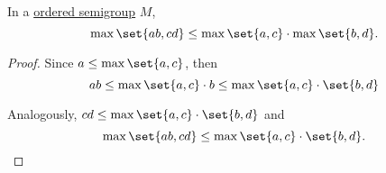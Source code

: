 \begin{lemma}\label{thm:ordered_semigroup_max_distributivity}
  In a \hyperref[def:ordered_semigroup]{ordered semigroup} \( M \),
  \begin{equation}\label{eq:thm:ordered_semigroup_max_distributivity}
    \max \set{a b, c d} \leq \max \set{a, c} \cdot \max \set{b, d}.
  \end{equation}
\end{lemma}
\begin{proof}
  Since \( a \leq \max \set{a, c} \), then
  \begin{equation*}
    ab
    \leq
    \max \set{a, c} \cdot b
    \leq
    \max \set{a, c} \cdot \set{b, d}
  \end{equation*}

  Analogously, \( cd \leq \max \set{a, c} \cdot \set{b, d} \) and
  \begin{equation*}
    \max \set{a b, c d} \leq \max \set{a, c} \cdot \set{b, d}.
  \end{equation*}
\end{proof}

